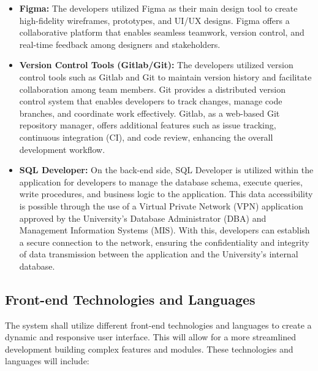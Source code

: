     \begin{itemize}
        \item[] \textbf{Figma:} The developers utilized Figma as their main design tool to create high-fidelity wireframes, prototypes, and UI/UX designs. Figma offers a collaborative platform that enables seamless teamwork, version control, and real-time feedback among designers and stakeholders. 
        \item[] \textbf{Version Control Tools (Gitlab/Git):} The developers utilized version control tools such as Gitlab and Git to maintain version history and facilitate collaboration among team members. Git provides a distributed version control system that enables developers to track changes, manage code branches, and coordinate work effectively. Gitlab, as a web-based Git repository manager, offers additional features such as issue tracking, continuous integration (CI), and code review, enhancing the overall development workflow.
        \item[] \textbf{SQL Developer:} On the back-end side, SQL Developer is utilized within the application for developers to manage the database schema, execute queries, write procedures, and business logic to the application. This data accessibility is possible through the use of a Virtual Private Network (VPN) application approved by the University's Database Administrator (DBA) and Management Information Systems (MIS). With this, developers can establish a secure connection to the network, ensuring the confidentiality and integrity of data transmission between the application and the University's internal database.
    \end{itemize}

\subsection{Front-end Technologies and Languages}
    The system shall utilize different front-end technologies and languages to create a dynamic and responsive user interface. This will allow for a more streamlined development building complex features and modules. These technologies and languages will include:
    
